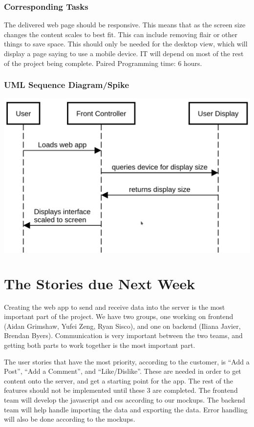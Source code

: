 \documentclass[12pt]{article}
\begin{document}
\subsubsection{Corresponding Tasks}
	The delivered web page should be responsive.  This means that as the screen size changes the content scales to best fit.  This can include removing flair or other things to save space.  This should only be needed for the desktop view, which will display a page saying to use a mobile device.  IT will depend on most of the rest of the project being complete.  Paired Programming time: 6 hours.
\subsubsection{UML Sequence Diagram/Spike}
\includegraphics[scale=0.5]{img/responsive_web_page.png}\linebreak


\section{The Stories due Next Week}

Creating the web app to send and receive data into the server is the most
important part of the project. We have two groups, one working on frontend
(Aidan Grimshaw, Yufei Zeng, Ryan Sisco), and one on backend (Iliana Javier,
Brendan Byers). Communication is very important between the two teams, and
getting both parts to work together is the most important part.

The user stories that have the most priority, according to the customer, is “Add
a Post”, “Add a Comment”, and  “Like/Dislike”. These are needed in order to get
content onto the server, and get a starting point for the app. The rest of the
features should not be implemented until these 3 are completed. The frontend
team will develop the javascript and css according to our mockups. The backend
team will help handle importing the data and exporting the data. Error handling
will also be done according to the mockups.
\end{document}
